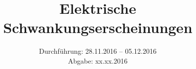 
\usepackage{showframe}

\subject{Versuch 57}
\title{Elektrische Schwankungserscheinungen}
\date{Durchführung: 28.11.2016 -- 05.12.2016 \\
      Abgabe: xx.xx.2016}



\maketitle
\newpage







\printbibliography


